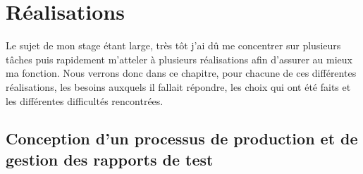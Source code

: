 \chapter{Réalisations}



Le sujet de mon stage étant large, très tôt j'ai dû me concentrer sur plusieurs tâches puis rapidement m'atteler à plusieurs réalisations afin d'assurer au mieux ma fonction. Nous verrons donc dans ce chapitre, pour chacune de ces différentes réalisations, les besoins auxquels il fallait répondre, les choix qui ont été faits et les différentes difficultés rencontrées.

\section{Conception d'un processus de production et de gestion des rapports de test}
